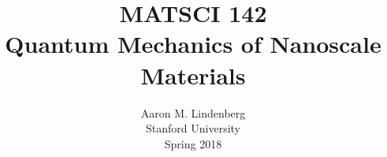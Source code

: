 \documentclass[12pt, english]{book}
\title{{\LARGE \textbf{MATSCI 142}} \\ Quantum Mechanics of Nanoscale Materials \vspace{10ex}}
\author{\vspace{1ex} Aaron M. Lindenberg \\ \vspace{1ex} Stanford University \\ Spring 2018}
\date{}
\begin{document}
	
\frontmatter %
\let\cleardoublepage\clearpage %
\maketitle
\tableofcontents


%

\mainmatter 		%











\appendix








\end{document}
